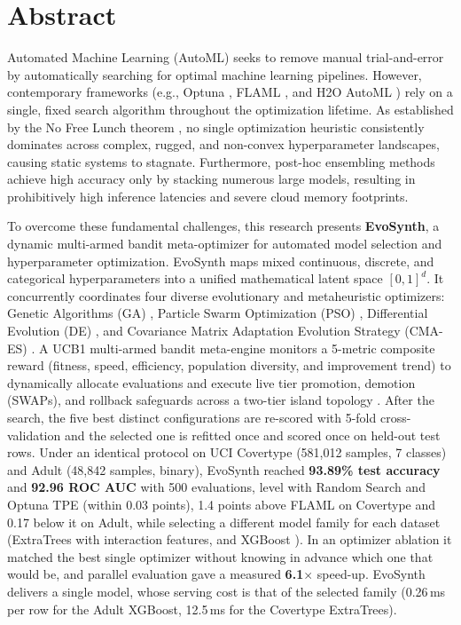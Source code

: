 \documentclass[11pt, a4paper]{article}
\begin{document}
\section{Abstract}
\noindent
Automated Machine Learning (AutoML) seeks to remove manual trial-and-error by automatically searching for optimal machine learning pipelines. However, contemporary frameworks (e.g., Optuna \cite{akiba2019optuna}, FLAML \cite{wang2021flaml}, and H2O AutoML \cite{ledell2020h2o}) rely on a single, fixed search algorithm throughout the optimization lifetime. As established by the No Free Lunch theorem \cite{wolpert1997no}, no single optimization heuristic consistently dominates across complex, rugged, and non-convex hyperparameter landscapes, causing static systems to stagnate. Furthermore, post-hoc ensembling methods achieve high accuracy only by stacking numerous large models, resulting in prohibitively high inference latencies and severe cloud memory footprints. 

To overcome these fundamental challenges, this research presents \textbf{EvoSynth}, a dynamic multi-armed bandit meta-optimizer for automated model selection and hyperparameter optimization. EvoSynth maps mixed continuous, discrete, and categorical hyperparameters into a unified mathematical latent space $[0,1]^d$. It concurrently coordinates four diverse evolutionary and metaheuristic optimizers: Genetic Algorithms (GA) \cite{holland1975adaptation}, Particle Swarm Optimization (PSO) \cite{kennedy1995particle}, Differential Evolution (DE) \cite{storn1997differential}, and Covariance Matrix Adaptation Evolution Strategy (CMA-ES) \cite{hansen2001completely}. A UCB1 \cite{auer2002finite} multi-armed bandit meta-engine monitors a 5-metric composite reward (fitness, speed, efficiency, population diversity, and improvement trend) to dynamically allocate evaluations and execute live tier promotion, demotion (SWAPs), and rollback safeguards across a two-tier island topology \cite{alba2002parallelism}. After the search, the five best distinct configurations are re-scored with 5-fold cross-validation and the selected one is refitted once and scored once on held-out test rows. Under an identical protocol on UCI Covertype \cite{blackard1999comparative} (581,012 samples, 7 classes) and Adult \cite{kohavi1996scaling} (48,842 samples, binary), EvoSynth reached \textbf{93.89\% test accuracy} and \textbf{92.96 ROC AUC} with 500 evaluations, level with Random Search \cite{bergstra2012random} and Optuna TPE \cite{bergstra2011algorithms} (within 0.03 points), 1.4 points above FLAML on Covertype and 0.17 below it on Adult, while selecting a different model family for each dataset (ExtraTrees \cite{geurts2006extremely} with interaction features, and XGBoost \cite{chen2016xgboost}). In an optimizer ablation it matched the best single optimizer without knowing in advance which one that would be, and parallel evaluation gave a measured \textbf{6.1$\times$} speed-up. EvoSynth delivers a single model, whose serving cost is that of the selected family (0.26\,ms per row for the Adult XGBoost, 12.5\,ms for the Covertype ExtraTrees).
\end{document}
